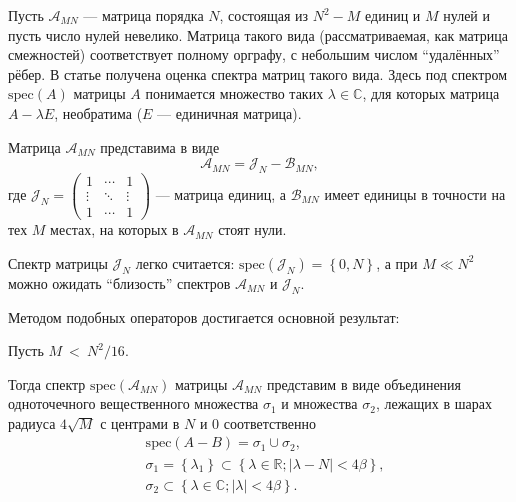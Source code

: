 Пусть \( \mathscr{A}_{MN} \) --- матрица порядка \( N \),
состоящая из \( N^2 - M \) единиц и \( M \) нулей
и пусть число нулей невелико.
Матрица такого вида (рассматриваемая, как матрица смежностей) соответствует
полному орграфу, с небольшим числом ``удалённых'' рёбер.
В статье получена оценка спектра
матриц такого вида.
Здесь под спектром \( \mathrm{spec}\left({A}\right) \) матрицы \( A \)
понимается множество таких \( \lambda\in\mathbb{C} \), для которых
матрица \( A - \lambda E \), необратима (\( E \) --- единичная матрица).

Матрица \( \mathscr{A}_{MN} \) представима в виде
\[
    \mathscr{A}_{MN} = \mathscr{J}_{N} - \mathscr{B}_{MN},
    \]
где \(
\mathscr{J}_{N} =
\begin{pmatrix}1 & \cdots & 1 \\
\vdots & \ddots & \vdots \\
1 & \cdots & 1
\end{pmatrix} \) --- матрица единиц,
а \( \mathscr{B}_{MN} \) имеет единицы в точности на тех \( M \)
местах, на которых в \( \mathscr{A}_{MN} \) стоят нули.

Спектр матрицы \( \mathscr{J}_{N} \) легко считается:
\( \mathrm{spec}\left({\mathscr{J}_{N}}\right) = \left\{0, N \right\} \),
а при \( M \ll N^2 \) можно ожидать ``близость'' спектров
\( \mathscr{A}_{MN} \) и \( \mathscr{J}_{N} \).

Методом подобных операторов \cite{baskakov-harmonic}
достигается основной результат:
\begin{thm}\label{thm:almostallones-spectra}
    Пусть
    \(M~<~\displaystyle{N^2/16}. \)

    Тогда спектр \( \mathrm{spec}\left({\mathscr{A}_{MN}}\right) \)
    матрицы \( \mathscr{A}_{MN} \)
    представим в виде объединения
    одноточечного вещественного множества \( \sigma_1 \)
    и множества \( \sigma_2 \),
    лежащих в шарах радиуса \( 4\sqrt{M} \)
    с центрами в \( N \) и \( 0 \) соответственно
    \begin{equation}\begin{aligned}
        & \mathrm{spec}\left({A-B}\right) = \sigma_1 \cup \sigma_2, \\
        & \sigma_1 = \left\{ \lambda_1 \right\}
          \subset \left\{ \lambda\in\mathbb{R}; \lvert \lambda - N\rvert < 4\beta \right\}, \\
        & \sigma_2 \subset \left\{\lambda\in\mathbb{C}; \lvert\lambda\rvert <4\beta \right\}. \\
    \end{aligned}\end{equation}
\end{thm}

